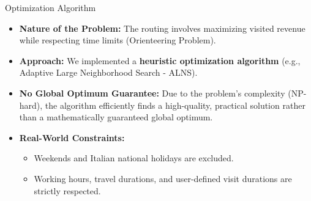 \begin{frame}{Optimization Algorithm}
\begin{itemize}
    \item \textbf{Nature of the Problem:} The routing involves maximizing visited revenue while respecting time limits (Orienteering Problem).
    \item \textbf{Approach:} We implemented a \textbf{heuristic optimization algorithm} (e.g., Adaptive Large Neighborhood Search - ALNS).
    \item \textbf{No Global Optimum Guarantee:} Due to the problem's complexity (NP-hard), the algorithm efficiently finds a high-quality, practical solution rather than a mathematically guaranteed global optimum.
    \item \textbf{Real-World Constraints:} 
        \begin{itemize}
            \item Weekends and Italian national holidays are excluded.
            \item Working hours, travel durations, and user-defined visit durations are strictly respected.
        \end{itemize}
\end{itemize}
\end{frame}
